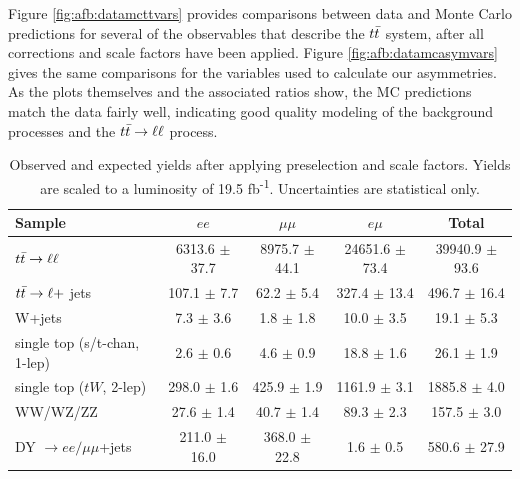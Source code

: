 Figure \ref{fig:afb:datamcttvars} provides comparisons between data
and Monte Carlo predictions for several of the observables
that describe the $t\bar{t}$ system, after all corrections and scale
factors have been applied. Figure \ref{fig:afb:datamcasymvars} gives
the same comparisons for the variables used to calculate our asymmetries.
As the plots themselves and the associated
ratios show, the MC predictions match the data fairly well, indicating
good quality modeling of the background processes and the
$t\bar{t} \rightarrow \ell\ell$ process.

\begin{table}[hbt]
\begin{center}
\caption{Observed and expected yields after applying preselection and scale
  factors. Yields are scaled to a luminosity of 19.5
  fb\textsuperscript{-1}. Uncertainties are statistical only.}
\label{tab:afb:datamcyields}
\begin{tabular}{l |  c  c  c  c}
\hline
                                        Sample   &                $ee$   &            $\mu\mu$   &              $e\mu$   &               Total  \\
\hline
                 $t\bar{t} \rightarrow \ell\ell$   &   6313.6 $\pm$ 37.7   &   8975.7 $\pm$ 44.1   &  24651.6 $\pm$ 73.4   &  39940.9 $\pm$ 93.6  \\
              $t\bar{t} \rightarrow \ell +$ jets   &     107.1 $\pm$ 7.7   &      62.2 $\pm$ 5.4   &    327.4 $\pm$ 13.4   &    496.7 $\pm$ 16.4  \\
                                        W+jets   &       7.3 $\pm$ 3.6   &       1.8 $\pm$ 1.8   &      10.0 $\pm$ 3.5   &      19.1 $\pm$ 5.3  \\
                  single top (s/t-chan, 1-lep)   &       2.6 $\pm$ 0.6   &       4.6 $\pm$ 0.9   &      18.8 $\pm$ 1.6   &      26.1 $\pm$ 1.9  \\
                        single top ($tW$, 2-lep) &     298.0 $\pm$ 1.6   &     425.9 $\pm$ 1.9   &    1161.9 $\pm$ 3.1   &    1885.8 $\pm$ 4.0  \\
                                      WW/WZ/ZZ   &      27.6 $\pm$ 1.4   &      40.7 $\pm$ 1.4   &      89.3 $\pm$ 2.3   &     157.5 $\pm$ 3.0  \\
               DY $\rightarrow ee/\mu\mu$+jets   &    211.0 $\pm$ 16.0   &    368.0 $\pm$ 22.8   &       1.6 $\pm$ 0.5   &    580.6 $\pm$ 27.9  \\

\end{tabular}
\end{center}
\end{table}
